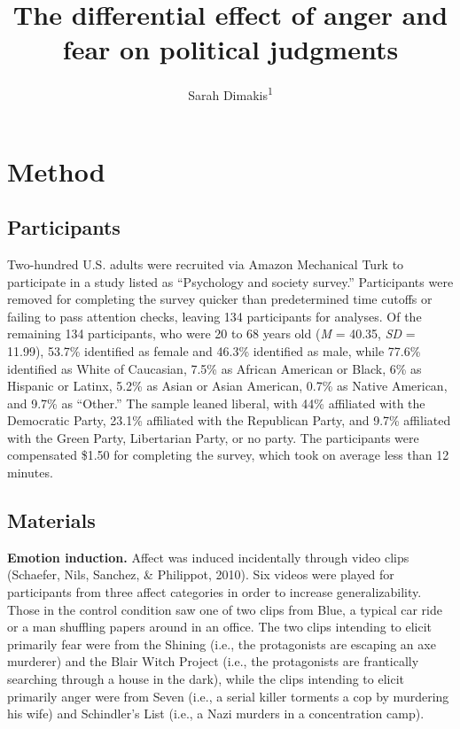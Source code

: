 \documentclass[man,draftall]{apa6}
\title{The differential effect of anger and fear on political judgments}
\author{Sarah Dimakis\textsuperscript{1}}
\date{}
\affiliation{
\vspace{0.5cm}
\textsuperscript{1} Univeristy of Oregon}
\begin{document}
\maketitle

\section{Method}\label{method}

\subsection{Participants}\label{participants}

Two-hundred U.S. adults were recruited via Amazon Mechanical Turk to
participate in a study listed as \enquote{Psychology and society
survey.} Participants were removed for completing the survey quicker
than predetermined time cutoffs or failing to pass attention checks,
leaving 134 participants for analyses. Of the remaining 134
participants, who were 20 to 68 years old (\emph{M} = 40.35, \emph{SD} =
11.99), 53.7\% identified as female and 46.3\% identified as male, while
77.6\% identified as White of Caucasian, 7.5\% as African American or
Black, 6\% as Hispanic or Latinx, 5.2\% as Asian or Asian American,
0.7\% as Native American, and 9.7\% as \enquote{Other.} The sample
leaned liberal, with 44\% affiliated with the Democratic Party, 23.1\%
affiliated with the Republican Party, and 9.7\% affiliated with the
Green Party, Libertarian Party, or no party. The participants were
compensated \$1.50 for completing the survey, which took on average less
than 12 minutes.

\subsection{Materials}\label{materials}

\textbf{Emotion induction.} Affect was induced incidentally through
video clips (Schaefer, Nils, Sanchez, \& Philippot, 2010). Six videos
were played for participants from three affect categories in order to
increase generalizability. Those in the control condition saw one of two
clips from Blue, a typical car ride or a man shuffling papers around in
an office. The two clips intending to elicit primarily fear were from
the Shining (i.e., the protagonists are escaping an axe murderer) and
the Blair Witch Project (i.e., the protagonists are frantically
searching through a house in the dark), while the clips intending to
elicit primarily anger were from Seven (i.e., a serial killer torments a
cop by murdering his wife) and Schindler's List (i.e., a Nazi murders in
a concentration camp).
\end{document}
